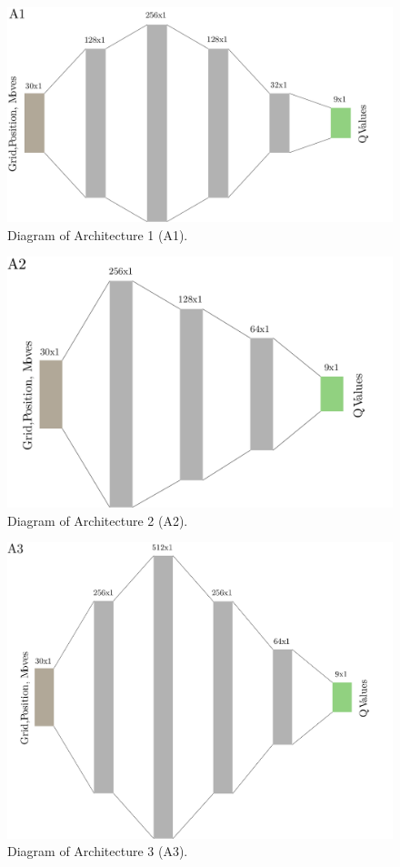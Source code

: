 \documentclass[
  12pt,
  openany]{book}
\begin{document}
\begin{figure}

{\centering \includegraphics[width=0.8\linewidth]{pics/A1} 

}

\caption{Diagram of Architecture 1 (A1).}\label{fig:A1}
\end{figure}



\begin{figure}

{\centering \includegraphics[width=0.8\linewidth]{pics/A2} 

}

\caption{Diagram of Architecture 2 (A2).}\label{fig:A2}
\end{figure}



\begin{figure}

{\centering \includegraphics[width=0.8\linewidth]{pics/A3} 

}

\caption{Diagram of Architecture 3 (A3).}\label{fig:A3}
\end{figure}
\end{document}
